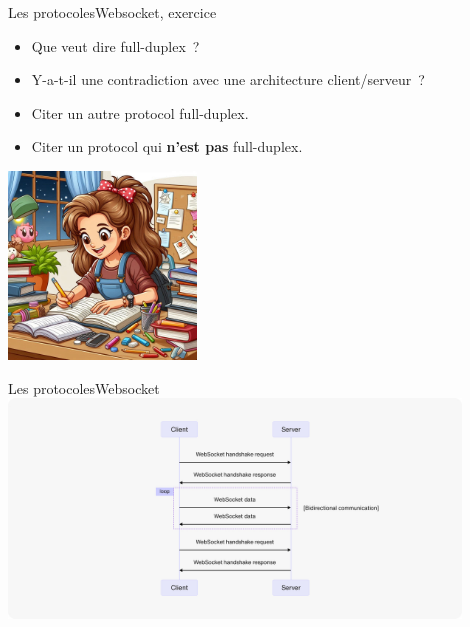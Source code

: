 \documentclass{beamer}
\begin{document}
    \begin{frame}{Les protocoles}{Websocket, exercice \execcounterdispinc{}}
        \begin{itemize}
            \item Que veut dire full-duplex~?
            \item Y-a-t-il une contradiction avec une architecture client/serveur~?
            \item Citer un autre protocol full-duplex.
            \item Citer un protocol qui \textbf{n'est pas} full-duplex.
        \end{itemize}
        \bigbreak
        \centering
        \includegraphics[width=5cm]{image/homework}
    \end{frame}

    \begin{frame}{Les protocoles}{Websocket\label{sendbird-protocole}}
        \centering
        \includegraphics[width=12cm]{image/tutorial-websocket-protocol-chart}
    \end{frame}
\end{document}
